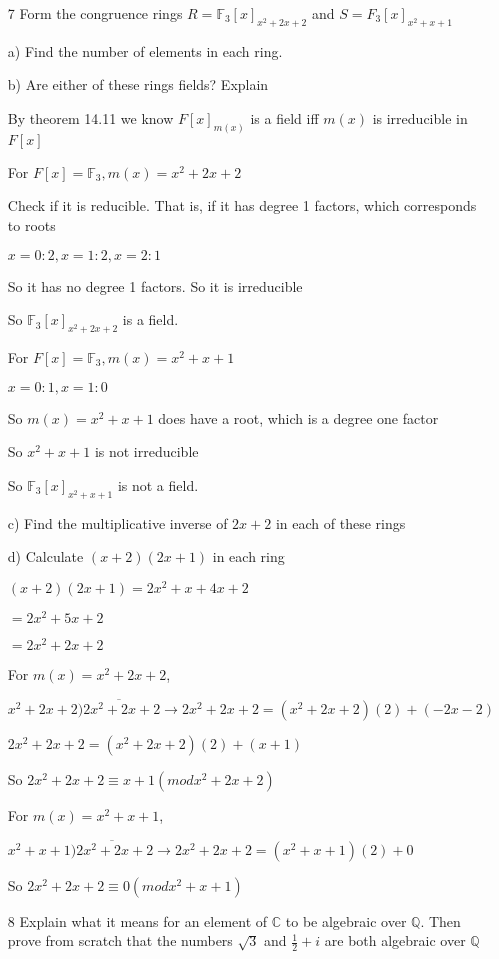 \documentclass[12pt]{article}
\begin{document}
\begin{itemize}
	\item[7] Form the congruence rings $R = \mathbb{F}_3[x]_{x^2 + 2x + 2}$ and $S = F_3[x]_{x^2 + x + 1}$

		a) Find the number of elements in each ring.

		b) Are either of these rings fields? Explain

		By theorem 14.11 we know $F[x]_{m(x)}$ is a field iff $m(x)$ is irreducible in $F[x]$

		For $F[x] = \mathbb{F}_3, m(x) = x^2 + 2x + 2$

		Check if it is reducible. That is, if it has degree 1 factors, which corresponds to roots

		$x = 0: 2, x = 1: 2, x = 2: 1$

		So it has no degree 1 factors. So it is irreducible

		So $\mathbb{F}_3[x]_{x^2 + 2x + 2}$ is a field.

		For $F[x] = \mathbb{F}_3, m(x) = x^2 + x + 1$

		$x = 0: 1, x = 1: 0$

		So $m(x) = x^2 + x + 1$ does have a root, which is a degree one factor

		So $x^2 + x + 1$ is not irreducible

		So $\mathbb{F}_3[x]_{x^2 + x + 1}$ is not a field.

		c) Find the multiplicative inverse of $2x +2$ in each of these rings

		d) Calculate $(x+2)(2x+1)$ in each ring

		$(x+2)(2x+1) = 2x^2 + x + 4x + 2$

		$= 2x^2 + 5x + 2$

		$= 2x^2 + 2x + 2$

		For $m(x) = x^2 + 2x + 2$,

		$x^2 + 2x + 2 \overline{)2x^2 + 2x + 2} \rightarrow 2x^2 + 2x + 2 = (x^2 + 2x + 2)(2) + (-2x - 2)$

		$2x^2 + 2x + 2 = (x^2 + 2x + 2)(2) + (x + 1)$

		So $2x^2 + 2x + 2 \equiv x+1 (mod x^2 + 2x + 2)$

		For $m(x) = x^2 + x + 1$,

		$x^2 + x + 1 \overline{)2x^2 + 2x + 2} \rightarrow 2x^2 + 2x + 2 = (x^2 + x + 1)(2) + 0$

		So $2x^2 + 2x + 2 \equiv 0 (mod x^2 + x + 1)$

	\item[8] Explain what it means for an element of $\mathbb{C}$ to be algebraic over $\mathbb{Q}$. Then prove from scratch that the numbers $\sqrt{3}$ and $\frac{1}{2} + i$ are both algebraic over $\mathbb{Q}$


\end{itemize}
\end{document}
